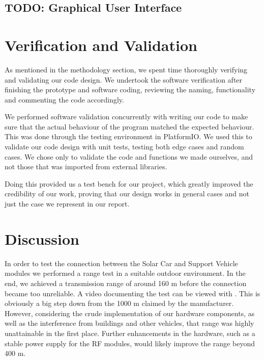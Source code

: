 \documentclass[conference]{IEEEtran}
\newcommand{\MYhref}[3][blue]{\href{#2}{\color{#1}{#3}}}
\newcommand{\todo}[1]{{\color{olive} TODO: #1}}
\begin{document}
\subsection{\todo{Graphical User Interface}}


\section{Verification and Validation} %
As mentioned in the methodology section, we spent time thoroughly verifying and validating our code design. We undertook the software verification after finishing the prototype and software coding, reviewing the naming, functionality and commenting the code accordingly.

We performed software validation concurrently with writing our code to make sure that the actual behaviour of the program matched the expected behaviour. This was done through the testing environment in PlatformIO. We used this to validate our code design with unit tests, testing both edge cases and random cases. We chose only to validate the code and functions we made ourselves, and not those that was imported from external libraries.

Doing this provided us a test bench for our project, which greatly improved the credibility of our work, proving that our design works in general cases and not just the case we represent in our report.

\section{Discussion}

In order to test the connection between the Solar Car and Support Vehicle modules we performed a range test in a suitable outdoor environment. In the end, we achieved a transmission range of around 160 m before the connection became too unreliable. A video documenting the test can be viewed with \MYhref{https://youtu.be/-iwST3REn40}{this link}. This is obviously a big step down from the 1000 m claimed by the manufacturer. However, considering the crude implementation of our hardware components, as well as the interference from buildings and other vehicles, that range was highly unattainable in the first place. Further enhancements in the hardware, such as a stable power supply for the RF modules, would likely improve the range beyond 400 m. 
 
\end{document}
